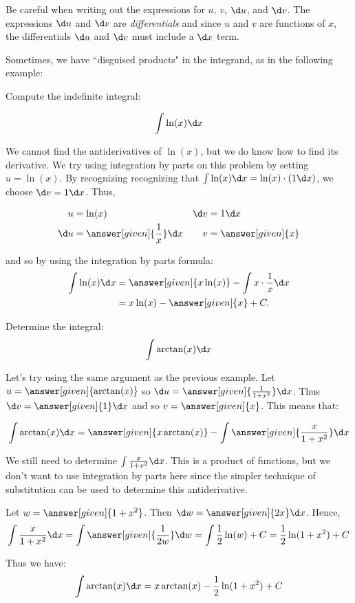 \documentclass{ximera}
\begin{document}
\begin{warning}
Be careful when writing out the expressions for $u$, $v$, $\d u$, and $\d v$.  The expressions $\d u$ and $\d v$ are \emph{differentials} and since $u$ and $v$ are functions of $x$, the differentials $\d u$ and $\d v$ must include a $\d x$ term.
\end{warning}

Sometimes, we have ``disguised products" in the integrand, as in the following example:

\begin{example}
Compute the indefinite integral:

\[
\int \ln(x)\d x
\]
\begin{explanation}
We cannot find the antiderivatives of $\ln(x)$, but we do know how to find its derivative.  We try using integration by parts on this problem by setting $u=\ln(x)$.  By recognizing recognizing that $\int \ln(x) \d x = \ln(x) \cdot (1 \d x)$, we choose $\d v = 1 \d x$.  Thus,

\begin{align*}
u &= \ln(x) & \d v & =1 \d x \\
 \d u &= \answer[given]{\frac{1}{x}} \d x & v&= \answer[given]{x}
\end{align*}

and so by using the integration by parts formula:
\begin{align*}
 \int \ln(x)\d x&=\answer[given]{x \ln(x)}-\int x \cdot \frac{1}{x}\d x\\
&= x\ln (x)- \answer[given]{x}+C.\\
\end{align*}
\end{explanation}
\end{example}

\begin{example}
Determine the integral:
\[ 
\int \arctan(x) \d x
\]
\begin{explanation}
Let's try using the same argument as the previous example.  Let $u=\answer[given]{\arctan (x)}$ so $\d u=\answer[given]{\frac{1}{1+x^{2}} } \d x$. Thus $\d v=\answer[given]{1} \d x$ and so $v=\answer[given]{x}$. 
This means that:

\[
\int \arctan(x) \d x= \answer[given]{x\arctan(x)}- \int \answer[given]{\frac{x}{1+x^{2}}} \d x
\]

We still need to determine $\int \frac{x}{1+x^{2}} \d x$. This is a product of functions, but we don't want to use integration by parts here since the simpler technique of substitution can be used to determine this antiderivative. 

Let $w=\answer[given]{1+x^{2}}$. Then $\d w=\answer[given]{2 x} \d x$. Hence, 
\[
\int \frac{x}{1+x^{2}} \d x= \int \answer[given]{\frac{1}{2 w}} \d w \\
 = \int \frac{1}{2} \ln(w) + C=\frac{1}{2} \ln(1+x^{2})+C \\
\]

Thus we have:
\[ 
\int \arctan(x) \d x = x \arctan(x) -\frac{1}{2} \ln(1+x^{2}) +C
\]
\end{explanation}
\end{example}
\end{document}
